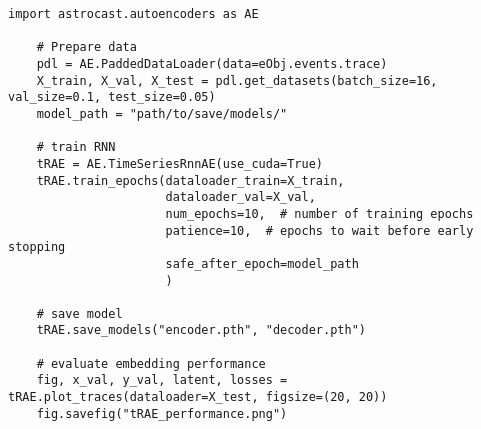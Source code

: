 \begin{lstlisting}[style=pyStyle]
    import astrocast.autoencoders as AE

    # Prepare data
    pdl = AE.PaddedDataLoader(data=eObj.events.trace)
    X_train, X_val, X_test = pdl.get_datasets(batch_size=16, val_size=0.1, test_size=0.05)
    model_path = "path/to/save/models/"

    # train RNN
    tRAE = AE.TimeSeriesRnnAE(use_cuda=True)
    tRAE.train_epochs(dataloader_train=X_train,
                      dataloader_val=X_val,
                      num_epochs=10,  # number of training epochs
                      patience=10,  # epochs to wait before early stopping
                      safe_after_epoch=model_path
                      )

    # save model
    tRAE.save_models("encoder.pth", "decoder.pth")

    # evaluate embedding performance
    fig, x_val, y_val, latent, losses = tRAE.plot_traces(dataloader=X_test, figsize=(20, 20))
    fig.savefig("tRAE_performance.png")
\end{lstlisting}

